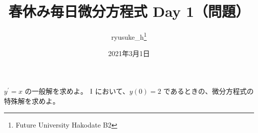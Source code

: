 \documentclass[a4j]{jsarticle}
\title{春休み毎日微分方程式 Day 1（問題）}
\author{ryusuke\_h\thanks{Future University Hakodate B2}}
\date{2021年3月1日}
\begin{document}
\maketitle

\begin{qparts}
    \qpart $ y ^ {\prime} = x $ の一般解を求めよ。
    \qpart $\rm I $ において、$ y(0) = 2 $ であるときの、微分方程式の特殊解を求めよ。
\end{qparts}
\end{document}
